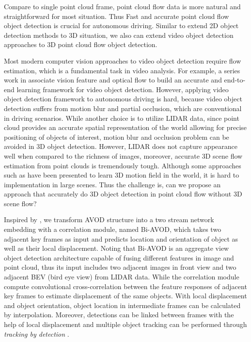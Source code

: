 \documentclass{bmvc2k}
\begin{document}
Compare to single point cloud frame, point cloud flow data is more natural and straightforward for most situation. Thus Fast and accurate point cloud flow object detection is crucial for autonomous driving. Similar to extend 2D object detection methods to 3D situation, we also can extend video object detection approaches to 3D point cloud flow object detection. 

Most modern computer vision approaches to video object detection require flow estimation, which is a fundamental task in video analysis. For example, a series work in \cite{zhu2017flow,zhu2018towards} associate vision feature and optical flow to build an accurate and end-to-end learning framework for video object detection. However, applying video object detection framework to autonomous driving is hard, because video object detection suffers from motion blur and partial occlusion, which are conventional in driving scenarios. While another choice is to utilize LIDAR data, since point cloud provides an accurate spatial representation of the world allowing for precise positioning of objects of interest, motion blur and occlusion problem can be avoided in 3D object detection. However, LIDAR does not capture appearance well when compared to the richness of images, moreover, accurate 3D scene flow estimation from point clouds is tremendously tough. Although some approaches such as \cite{liu2018learning, behl2018pointflownet} have been presented to learn 3D motion field in the world, it is hard to implementation in large scenes. Thus the challenge is, can we propose an approach that accurately do 3D object detection in point cloud flow without 3D scene flow?

Inspired by \cite{feichtenhofer2017detect}, we transform AVOD \cite{ku2018joint} structure into 
a two stream network embedding with a correlation module, named Bi-AVOD, which takes two adjacent key frames as input and predicts location and orientation of object as well as their local displacement. Noting that Bi-AVOD is an aggregate view object detection architecture capable of fusing different features in image and point cloud, thus its input includes two adjacent images in front view and two adjacent BEV (bird eye view) from LIDAR data. While the correlation module compute convolutional cross-correlation between the feature responses of adjacent key frames to estimate displacement of the same objects. With local displacement and object orientation, object location in intermediate frames can be calculated by interpolation. Moreover, detections can be linked between frames with the help of local displacement and multiple object tracking can be performed through \textit{tracking by detection} \cite{lenz2015followme}. 
\end{document}
